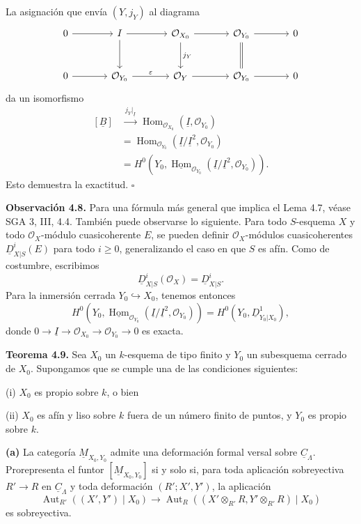 La asignación que envía $(Y,j_Y)$ al diagrama
\[
\begin{tikzcd}[column sep=large,row sep=large]
0 \arrow[r]
& \underline I \arrow[r] \arrow[d]
& \mathcal O_{X_0} \arrow[r] \arrow[d,"\sisi{\mathfrak{J}_Y}{j_Y}"]
& \mathcal O_{Y_0} \arrow[r] \arrow[d,equal]
& 0 \\
0 \arrow[r]
& \mathcal O_{Y_0} \arrow[r,"\varepsilon"]
& \mathcal O_Y \arrow[r]
& \mathcal O_{Y_0} \arrow[r]
& 0
\end{tikzcd}
\]
da un isomorfismo
\[
\begin{aligned}
[\underline B]
&\xrightarrow{\ j_Y|_{\underline I}\ }
\operatorname{Hom}_{\mathcal O_{X_0}}
 (\underline I,\mathcal O_{Y_0}) \\
&=
\operatorname{Hom}_{\mathcal O_{Y_0}}
 (\underline I/\underline I^2,\mathcal O_{Y_0}) \\
&=
H^0\!\left(
Y_0,
\underline{\operatorname{Hom}}_{\mathcal O_{Y_0}}
(\underline I/\underline I^2,\mathcal O_{Y_0})
\right).
\end{aligned}
\]
Esto demuestra la exactitud. \hfill$\square$


\medskip
\noindent\textbf{Observación 4.8.}
Para una fórmula más general que implica el Lema 4.7, véase SGA 3,
III, 4.4. También puede observarse lo siguiente. Para todo
$S$-esquema $X$ y todo $\mathcal O_X$-módulo cuasicoherente $E$, se
pueden definir $\mathcal O_X$-módulos cuasicoherentes
$\underline D^i_{X|S}(E)$ para todo $i\geq0$, generalizando el caso
en que $S$ es afín. Como de costumbre, escribimos
\[
\underline D^i_{X|S}(\mathcal O_X)=\underline D^i_{X|S}.
\]
Para la inmersión cerrada $Y_0\hookrightarrow X_0$, tenemos entonces
\[
H^0\!\left(
Y_0,
\underline{\operatorname{Hom}}_{\mathcal O_{Y_0}}
(\underline I/\underline I^2,\mathcal O_{Y_0})
\right)
=H^0(Y_0,\underline D^1_{Y_0|X_0}),
\]
donde
$0\longrightarrow\underline I\longrightarrow\mathcal O_{X_0}
\longrightarrow\mathcal O_{Y_0}\longrightarrow0$ es exacta.

\medskip
\noindent\textbf{Teorema 4.9.}
Sea $X_0$ un $k$-esquema de tipo finito y $Y_0$ un subesquema
cerrado de $X_0$. Supongamos que se cumple una de las condiciones
siguientes:

\smallskip
\noindent(i) $X_0$ es propio sobre $k$, o bien

\noindent(ii) $X_0$ es afín y liso sobre $k$ fuera de un número
finito de puntos, y $Y_0$ es propio sobre $k$.

\smallskip
\noindent\textbf{(a)}
La categoría $\underline M_{X_0,Y_0}$ admite una deformación formal
versal sobre $\underline C_\Lambda$. Prorepresenta el funtor
$[\underline M_{X_0,Y_0}]$ si y solo si, para toda aplicación
sobreyectiva $R'\longrightarrow R$ en $\underline C_\Lambda$ y toda
deformación $(R';X',Y')$, la aplicación
\[
\operatorname{Aut}_{R'}((X',Y')\mid X_0)
\longrightarrow
\operatorname{Aut}_{R}\!\left(
(X'\otimes_{R'}R,Y'\otimes_{R'}R)\mid X_0
\right)
\]
es sobreyectiva.

